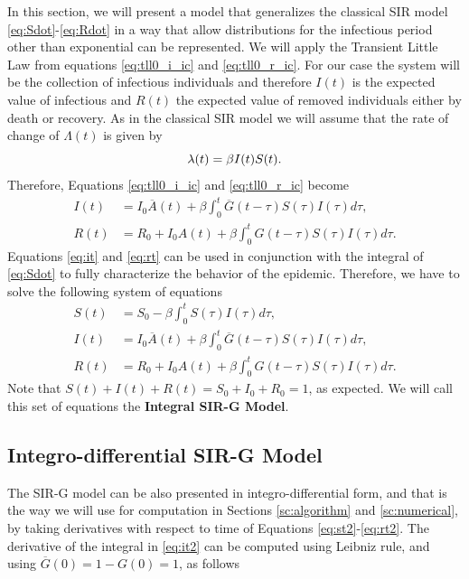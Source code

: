 \documentclass[USenglish,10pt]{article}
\newcommand{\Ab}{\overline{A}\xspace}
\newcommand{\Gb}{\overline{G}\xspace}
\newcommand{\la}{\ensuremath\lambda\xspace}
\begin{document}
In this section, we will present a model that generalizes the classical SIR model \eqref{eq:Sdot}-\eqref{eq:Rdot} in a way that allow distributions for the infectious period other than exponential can be represented.
We will apply the Transient Little Law from equations \eqref{eq:tll0_i_ic} and \eqref{eq:tll0_r_ic}.
For our case the system will be the collection of infectious individuals and therefore $I(t)$ is the expected value of infectious and $R(t)$ the expected value of removed individuals either by death or recovery.
As in the classical SIR model we will assume that the rate of change of $\Lambda(t)$ is given by
\begin{equation}
\la(t) = \beta I(t)S(t).
\label{eq:dM}
\end{equation}
Therefore, Equations \eqref{eq:tll0_i_ic} and \eqref{eq:tll0_r_ic} become
\begin{align}
	I(t) &= I_0\Ab(t) + \beta\int_0^t \Gb(t-\tau) S(\tau)I(\tau)d\tau,   \label{eq:it} \\
	R(t) &= R_0 + I_0A(t) + \beta\int_0^t G(t-\tau) S(\tau)I(\tau)d\tau.   \label{eq:rt}
\end{align}
Equations \eqref{eq:it} and \eqref{eq:rt} can be used in conjunction with the integral of \eqref{eq:Sdot} to fully characterize the behavior of the epidemic. Therefore, we have to solve the following system of equations
\begin{subequations}
\begin{align}
S(t) &= S_0 - \beta\int_0^t  S(\tau)I(\tau)d\tau, \label{eq:st2} \\
I(t) &= I_0 \Ab(t) + \beta\int_0^t \Gb(t-\tau) S(\tau)I(\tau)d\tau, \label{eq:it2} \\
R(t) &= R_0  + I_0A(t) +  \beta\int_0^t G(t-\tau) S(\tau)I(\tau)d\tau.   \label{eq:rt2}
\end{align}
\end{subequations}
Note that $S(t)+I(t)+R(t)=S_0+I_0+R_0=1$, as expected. We will call this set of equations the \textbf{Integral SIR-G Model}.


\subsection{Integro-differential SIR-G Model}

The SIR-G model can be also presented in integro-differential form, and that is the way we will use for computation in Sections \ref{sc:algorithm} and \ref{sc:numerical}, by taking derivatives with respect to time of Equations \eqref{eq:st2}-\eqref{eq:rt2}. The derivative of the integral in \eqref{eq:it2} can be computed using Leibniz rule, and using $\Gb(0)=1-G(0)=1$, as follows
\end{document}
